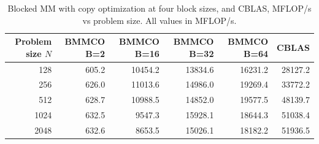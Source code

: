 \begin{table}[htbp]
\centering
\begin{tabular}{rrrrrr}
\hline
Problem size $N$ & BMMCO B=2 & BMMCO B=16 & BMMCO B=32 & BMMCO B=64 & CBLAS \\
\hline
128 & 605.2 & 10454.2 & 13834.6 & 16231.2 & 28127.2 \\
256 & 626.0 & 11013.6 & 14986.0 & 19269.4 & 33772.2 \\
512 & 628.7 & 10988.5 & 14852.0 & 19577.5 & 48139.7 \\
1024 & 632.5 & 9547.3 & 15928.1 & 18644.3 & 51038.4 \\
2048 & 632.6 & 8653.5 & 15026.1 & 18182.2 & 51936.5 \\
\hline
\end{tabular}
\caption{Blocked MM with copy optimization at four block sizes, and CBLAS, MFLOP/s vs problem size. All values in MFLOP/s.}
\label{tab:blocked_vs_blas}
\end{table}

